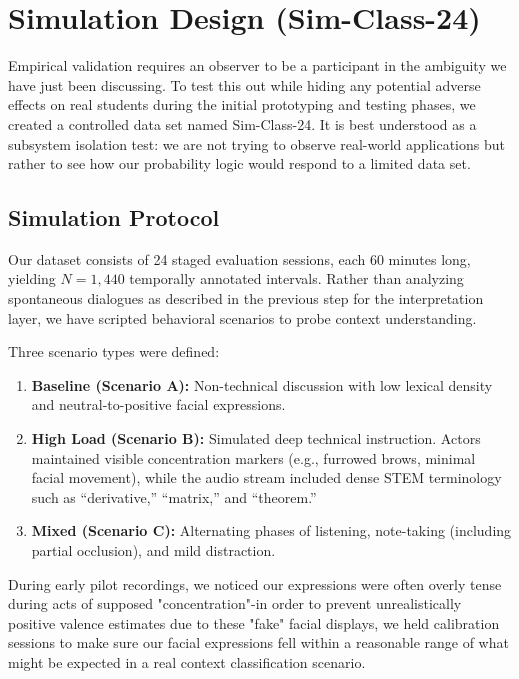 \documentclass[conference]{IEEEtran}
\begin{document}
\section{Simulation Design (Sim-Class-24)}

Empirical validation requires an observer to be a participant in the ambiguity we have just been discussing. To test this out while hiding any potential adverse effects on real students during the initial prototyping and testing phases, we created a controlled data set named Sim-Class-24. It is best understood as a subsystem isolation test: we are not trying to observe real-world applications but rather to see how our probability logic would respond to a limited data set.

\subsection{Simulation Protocol}
Our dataset consists of 24 staged evaluation sessions, each 60 minutes long, yielding $N = 1,440$ temporally annotated intervals. Rather than analyzing spontaneous dialogues as described in the previous step for the interpretation layer, we have scripted behavioral scenarios to probe context understanding.

Three scenario types were defined:
\begin{enumerate}
    \item \textbf{Baseline (Scenario A):} Non-technical discussion with low lexical density and neutral-to-positive facial expressions.
    \item \textbf{High Load (Scenario B):} Simulated deep technical instruction. Actors maintained visible concentration markers (e.g., furrowed brows, minimal facial movement), while the audio stream included dense STEM terminology such as “derivative,” “matrix,” and “theorem.”
    \item \textbf{Mixed (Scenario C):} Alternating phases of listening, note-taking (including partial occlusion), and mild distraction.
\end{enumerate}

During early pilot recordings, we noticed our expressions were often overly tense during acts of supposed "concentration"-in order to prevent unrealistically positive valence estimates due to these "fake" facial displays, we held calibration sessions to make sure our facial expressions fell within a reasonable range of what might be expected in a real context classification scenario.
\end{document}
